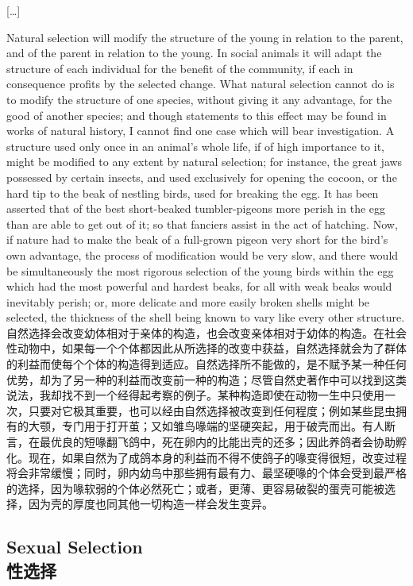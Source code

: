 \begin{center}
[\ldots]
\end{center}

\darwinpair
{Natural selection will modify the structure of the young in relation to the parent, and of the parent in relation to the young. In social animals it will adapt the structure of each individual for the benefit of the community, if each in consequence profits by the selected change. What natural selection cannot do is to modify the structure of one species, without giving it any advantage, for the good of another species; and though statements to this effect may be found in works of natural history, I cannot find one case which will bear investigation. A structure used only once in an animal's whole life, if of high importance to it, might be modified to any extent by natural selection; for instance, the great jaws possessed by certain insects, and used exclusively for opening the cocoon, or the hard tip to the beak of nestling birds, used for breaking the egg. It has been asserted that of the best short-beaked tumbler-pigeons more perish in the egg than are able to get out of it; so that fanciers assist in the act of hatching. Now, if nature had to make the beak of a full-grown pigeon very short for the bird's own advantage, the process of modification would be very slow, and there would be simultaneously the most rigorous selection of the young birds within the egg which had the most powerful and hardest beaks, for all with weak beaks would inevitably perish; or, more delicate and more easily broken shells might be selected, the thickness of the shell being known to vary like every other structure.}
{自然选择会改变幼体相对于亲体的构造，也会改变亲体相对于幼体的构造。在社会性动物中，如果每一个个体都因此从所选择的改变中获益，自然选择就会为了群体的利益而使每个个体的构造得到适应。自然选择所不能做的，是不赋予某一种任何优势，却为了另一种的利益而改变前一种的构造；尽管自然史著作中可以找到这类说法，我却找不到一个经得起考察的例子。某种构造即使在动物一生中只使用一次，只要对它极其重要，也可以经由自然选择被改变到任何程度；例如某些昆虫拥有的大颚，专门用于打开茧；又如雏鸟喙端的坚硬突起，用于破壳而出。有人断言，在最优良的短喙翻飞鸽中，死在卵内的比能出壳的还多；因此养鸽者会协助孵化。现在，如果自然为了成鸽本身的利益而不得不使鸽子的喙变得很短，改变过程将会非常缓慢；同时，卵内幼鸟中那些拥有最有力、最坚硬喙的个体会受到最严格的选择，因为喙软弱的个体必然死亡；或者，更薄、更容易破裂的蛋壳可能被选择，因为壳的厚度也同其他一切构造一样会发生变异。}

\subsection*{Sexual Selection\\性选择}

